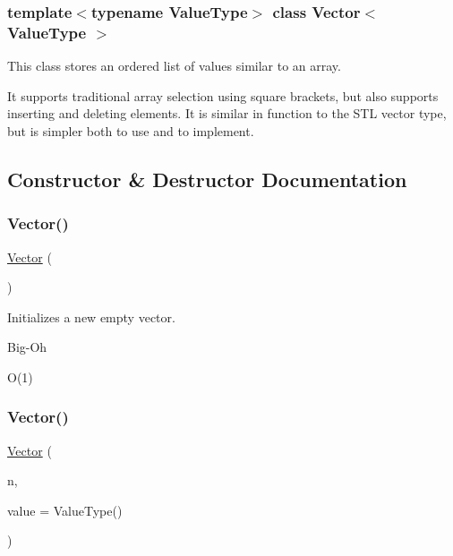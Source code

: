 \subsubsection*{template$<$typename Value\+Type$>$\newline
class Vector$<$ Value\+Type $>$}

This class stores an ordered list of values similar to an array. 

It supports traditional array selection using square brackets, but also supports inserting and deleting elements. It is similar in function to the S\+TL {\ttfamily vector} type, but is simpler both to use and to implement. 

\subsection{Constructor \& Destructor Documentation}
\mbox{\label{classVector_a4df026156780bc0ca651c342b7d6daa4}} 
\subsubsection{\texorpdfstring{Vector()}{Vector()}\hspace{0.1cm}{\footnotesize\ttfamily [1/4]}}
{\footnotesize\ttfamily \mbox{\hyperlink{classVector}{Vector}} (\begin{DoxyParamCaption}{ }\end{DoxyParamCaption})}



Initializes a new empty vector. 

\begin{DoxyRefDesc}{Big-\/\+Oh}
\item[\mbox{\hyperlink{BigOh__BigOh000099}{Big-\/\+Oh}}]O(1) \end{DoxyRefDesc}
\mbox{\label{classVector_abf5f4a6c2e8f722dfaed5c07027a84ac}} 
\subsubsection{\texorpdfstring{Vector()}{Vector()}\hspace{0.1cm}{\footnotesize\ttfamily [2/4]}}
{\footnotesize\ttfamily \mbox{\hyperlink{classVector}{Vector}} (\begin{DoxyParamCaption}\item[{int}]{n,  }\item[{Value\+Type}]{value = {\ttfamily ValueType()} }\end{DoxyParamCaption})\hspace{0.3cm}{\ttfamily [explicit]}}



